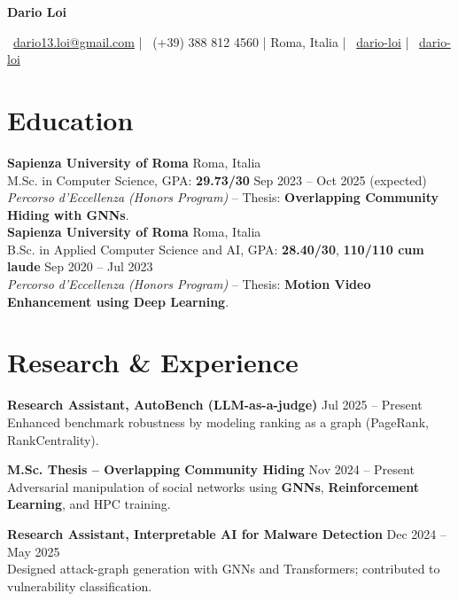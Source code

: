 \documentclass[a4paper,10pt]{article}
\begin{document}
\centerline{\Huge \bf Dario Loi}
\vspace{6pt}
\centerline{%
 \ \href{mailto:dario13.loi@gmail.com}{dario13.loi@gmail.com} \quad|\quad
{} \ (+39) 388 812 4560 \quad|\quad
{} Roma, Italia \quad|\quad
{} \ \href{https://github.com/dario-loi}{dario-loi} \quad|\quad
{} \ \href{https://www.linkedin.com/in/dario-loi/}{dario-loi}
}

\section*{Education}
\noindent
\textbf{Sapienza University of Roma} \hfill Roma, Italia \\
M.Sc. in Computer Science, GPA: \textbf{29.73/30} \hfill Sep 2023 -- Oct 2025 (expected) \\
\emph{Percorso d'Eccellenza (Honors Program)} -- Thesis: \textbf{Overlapping Community Hiding with GNNs}. \\

\noindent
\textbf{Sapienza University of Roma} \hfill Roma, Italia \\
B.Sc. in Applied Computer Science and AI, GPA: \textbf{28.40/30}, \textbf{110/110 cum laude} \hfill Sep 2020 -- Jul 2023 \\
\emph{Percorso d'Eccellenza (Honors Program)} -- Thesis: \textbf{Motion Video Enhancement using Deep Learning}.  

\section*{Research \& Experience}
\noindent
\textbf{Research Assistant, AutoBench (LLM-as-a-judge)} \hfill Jul 2025 -- Present \\
Enhanced benchmark robustness by modeling ranking as a graph (PageRank, RankCentrality).

\noindent
\textbf{M.Sc. Thesis – Overlapping Community Hiding} \hfill Nov 2024 -- Present \\
Adversarial manipulation of social networks using \textbf{GNNs}, \textbf{Reinforcement Learning}, and HPC training.

\noindent
\textbf{Research Assistant, Interpretable AI for Malware Detection} \hfill Dec 2024 -- May 2025 \\
Designed attack-graph generation with GNNs and Transformers; contributed to vulnerability classification.
\end{document}
